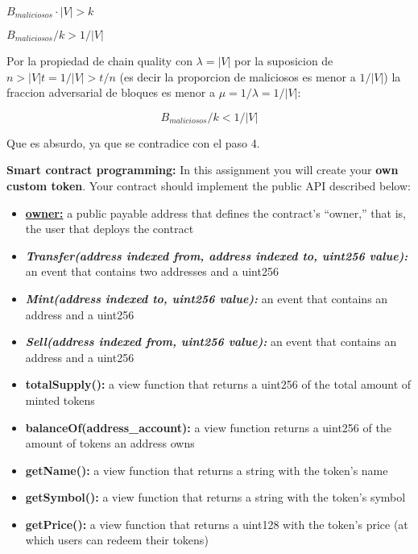 \documentclass[12pt,addpoints,answers]{exam}
\begin{document}
\begin{questions}
\begin{parts}
\begin{solution}
\begin{enumerate}
{            $B_{maliciosos} \cdot |V|> k$

            $B_{maliciosos} / k > 1 / |V|$

            \item{Por la propiedad de chain quality con $\lambda = |V|$ por la suposicion de $n > |V| t = 1 / |V| > t/n$ (es
            decir la proporcion de maliciosos es menor a $1/|V|$) la fraccion adversarial de bloques es menor a 
            $\mu = 1 / \lambda =  1 / |V|$:

            $$B_{maliciosos} / k < 1/|V| $$

            Que es absurdo, ya que se contradice con el paso 4.

            
            }

            }
        \end{enumerate}

    \end{solution}

\end{parts}

\newpage

\question \textbf{Smart contract programming:}  In this assignment you will create your {\bf own custom token}. Your contract should implement the public API described below:

\begin{itemize}
\item \underline{\textbf{owner:}} a public payable address that defines the contract’s ``owner,'' that is, the user that deploys the contract
\item \textbf{\textit{Transfer(address indexed from, address indexed to, uint256 value):}} an event that contains two addresses and a uint256
\item \textbf{\textit{Mint(address indexed to, uint256 value):}} an event that contains an address and a uint256
\item \textbf{\textit{Sell(address indexed from, uint256 value):}} an event that contains an address and a uint256

\item \textbf{totalSupply():} a view function that returns a uint256 of the total amount of minted tokens
\item \textbf{balanceOf(address\_account):} a view function returns a uint256 of the amount of tokens
an address owns
\item \textbf{getName():} a view function that returns a string with the token’s name
\item \textbf{getSymbol():} a view function that returns a string with the token’s symbol
\item \textbf{getPrice():} a view function that returns a uint128 with the token’s price (at which users can
redeem their tokens)


\end{itemize}
\end{questions}
\end{document}

